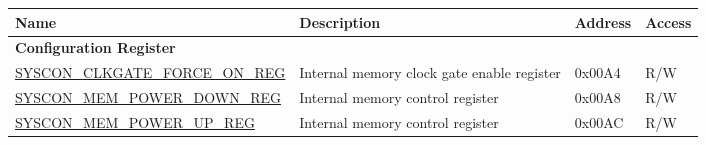 \begin{longtable}{ | p{6.5cm} | p{6.5cm} | p{1.3cm} | p{1cm} |}
\hline\rowcolor{lightgray}
Name & Description &  Address & Access \\ \hline
\endhead
\multicolumn{4}{|l|}{\textbf{Configuration Register}} \\ \hline
\hyperref[regdesc:SYSCONCLKGATEFORCEONREG]{SYSCON\_CLKGATE\_FORCE\_ON\_REG} & Internal memory clock gate enable register & 0x00A4 & R/W \\ \hline
\hyperref[regdesc:SYSCONMEMPOWERDOWNREG]{SYSCON\_MEM\_POWER\_DOWN\_REG} & Internal memory control register & 0x00A8 & R/W \\ \hline
\hyperref[regdesc:SYSCONMEMPOWERUPREG]{SYSCON\_MEM\_POWER\_UP\_REG} & Internal memory control register & 0x00AC & R/W \\ \hline
\end{longtable}
